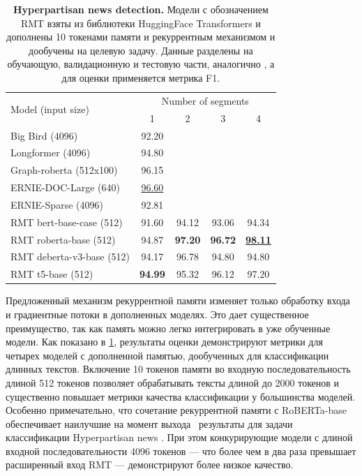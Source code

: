 \begin{table}
\centering
\begin{tabular}{lcccc}
\hline
\multirow{2}{*}{Model (input size)} & \multicolumn{4}{c}{Number of segments} \\
                                    & 1         & 2         & 3         & 4         \\
\hline
Big Bird (4096) \cite{zaheer2020big} & 92.20     &           &           &           \\
Longformer (4096) \cite{beltagy2020longformer} & 94.80     &           &           &           \\
Graph-roberta (512x100) \cite{xu2021contrastive} & 96.15     &           &           &           \\
ERNIE-DOC-Large (640) \cite{ding-etal-2021-ernie-doc} & \underline{96.60} &           &           &           \\
ERNIE-Sparse (4096) \cite{liu2022ernie} & 92.81     &           &           &           \\
\hline
RMT bert-base-case (512) & 91.60 & 94.12 & 93.06 & 94.34 \\
RMT roberta-base (512) & 94.87 & \textbf{97.20} & \textbf{96.72} & \underline{\textbf{98.11}} \\
RMT deberta-v3-base (512) & 94.17 & 96.78 & 94.80 & 94.80 \\
RMT t5-base (512) & \textbf{94.99} & 95.32 & 96.12 & 97.20 \\
\hline
\end{tabular}
\caption{\textbf{Hyperpartisan news detection.} Модели с обозначением RMT взяты из библиотеки HuggingFace Transformers и дополнены 10 токенами памяти и рекуррентным механизмом и дообучены на целевую задачу. Данные разделены на обучающую, валидационную и тестовую части, аналогично \cite{beltagy2020longformer}, а для оценки применяется метрика F1.}
\label{tab:hyp}
\end{table}    


Предложенный механизм рекуррентной памяти изменяет только обработку входа и градиентные потоки в дополненных моделях. Это дает существенное преимущество, так как память можно легко интегрировать в уже обученные модели. Как показано в \cref{tab:hyp}, результаты оценки демонстрируют метрики для четырех моделей с дополненной памятью, дообученных для классификации длинных текстов. Включение 10 токенов памяти во входную последовательность длиной 512 токенов позволяет обрабатывать тексты длиной до 2000 токенов и существенно повышает метрики качества классификации у большинства моделей. Особенно примечательно, что сочетание рекуррентной памяти с RoBERTa-base обеспечивает наилучшие на момент выхода~\cite{bulatov2022recurrent} результаты для задачи классификации Hyperpartisan news \cite{kiesel2019semeval}. При этом конкурирующие модели с длиной входной последовательности 4096 токенов — что более чем в два раза превышает расширенный вход RMT — демонстрируют более низкое качество.


